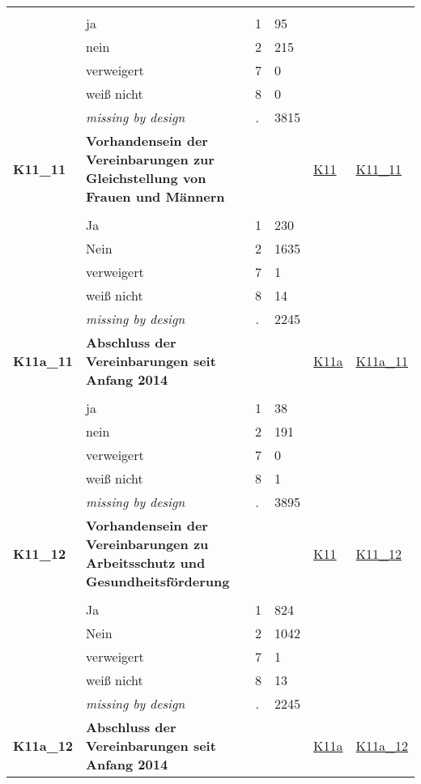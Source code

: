 \begin{longtable}{| L{2.45cm} | L{6cm} | C{1.5cm} | R{1cm} | C{2.25cm} | C{2.25cm} |}
   &  &  &  &  &  \\ 
   & ja & 1 & 95 &  &  \\ 
   & nein & 2 & 215 &  &  \\ 
   & verweigert & 7 & 0 &  &  \\ 
   & weiß nicht & 8 & 0 &  &  \\ 
   & \textit{missing by design} & \textit{.} & 3815 &  &  \\ 
   \midrule
\textbf{K11\_11}\label{var:K11:11} & \textbf{Vorhandensein der Vereinbarungen zur Gleichstellung von Frauen und Männern} &  &  & \hyperref[K11]{K11} & \hyperref[var:suf:K11:11]{K11\_11} \\ 
   &  &  &  &  &  \\ 
   & Ja & 1 & 230 &  &  \\ 
   & Nein & 2 & 1635 &  &  \\ 
   & verweigert & 7 & 1 &  &  \\ 
   & weiß nicht & 8 & 14 &  &  \\ 
   & \textit{missing by design} & \textit{.} & 2245 &  &  \\ 
   \midrule
\textbf{K11a\_11}\label{var:K11a:11} & \textbf{Abschluss der Vereinbarungen seit Anfang 2014} &  &  & \hyperref[K11a]{K11a} & \hyperref[var:suf:K11a:11]{K11a\_11} \\ 
   &  &  &  &  &  \\ 
   & ja & 1 & 38 &  &  \\ 
   & nein & 2 & 191 &  &  \\ 
   & verweigert & 7 & 0 &  &  \\ 
   & weiß nicht & 8 & 1 &  &  \\ 
   & \textit{missing by design} & \textit{.} & 3895 &  &  \\ 
   \midrule
\textbf{K11\_12}\label{var:K11:12} & \textbf{Vorhandensein der Vereinbarungen zu Arbeitsschutz und Gesundheitsförderung} &  &  & \hyperref[K11]{K11} & \hyperref[var:suf:K11:12]{K11\_12} \\ 
   &  &  &  &  &  \\ 
   & Ja & 1 & 824 &  &  \\ 
   & Nein & 2 & 1042 &  &  \\ 
   & verweigert & 7 & 1 &  &  \\ 
   & weiß nicht & 8 & 13 &  &  \\ 
   & \textit{missing by design} & \textit{.} & 2245 &  &  \\ 
   \midrule
\textbf{K11a\_12}\label{var:K11a:12} & \textbf{Abschluss der Vereinbarungen seit Anfang 2014} &  &  & \hyperref[K11a]{K11a} & \hyperref[var:suf:K11a:12]{K11a\_12} \\ 

\end{longtable}
